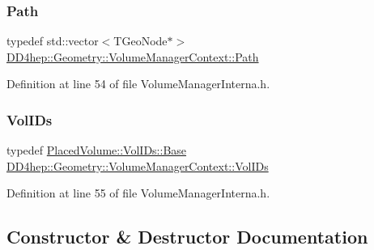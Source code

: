\subsubsection{\texorpdfstring{Path}{Path}}
{\footnotesize\ttfamily typedef std\+::vector$<$T\+Geo\+Node$\ast$$>$ \hyperlink{class_d_d4hep_1_1_geometry_1_1_volume_manager_context_a7873b42c6ad25a77d4d7e240286a934c}{D\+D4hep\+::\+Geometry\+::\+Volume\+Manager\+Context\+::\+Path}}



Definition at line 54 of file Volume\+Manager\+Interna.\+h.

\hypertarget{class_d_d4hep_1_1_geometry_1_1_volume_manager_context_aedf28d4a226428cfc6ebaabaee0b4c9e}{}\label{class_d_d4hep_1_1_geometry_1_1_volume_manager_context_aedf28d4a226428cfc6ebaabaee0b4c9e} 
\subsubsection{\texorpdfstring{Vol\+I\+Ds}{VolIDs}}
{\footnotesize\ttfamily typedef \hyperlink{class_d_d4hep_1_1_geometry_1_1_placed_volume_extension_1_1_vol_i_ds_a9328d0964ef092fd108679b2ecafd5b7}{Placed\+Volume\+::\+Vol\+I\+Ds\+::\+Base} \hyperlink{class_d_d4hep_1_1_geometry_1_1_volume_manager_context_aedf28d4a226428cfc6ebaabaee0b4c9e}{D\+D4hep\+::\+Geometry\+::\+Volume\+Manager\+Context\+::\+Vol\+I\+Ds}}



Definition at line 55 of file Volume\+Manager\+Interna.\+h.



\subsection{Constructor \& Destructor Documentation}
\hypertarget{class_d_d4hep_1_1_geometry_1_1_volume_manager_context_a7fabfa335945589f35053fa3bc3dcfc7}{}\label{class_d_d4hep_1_1_geometry_1_1_volume_manager_context_a7fabfa335945589f35053fa3bc3dcfc7} 
